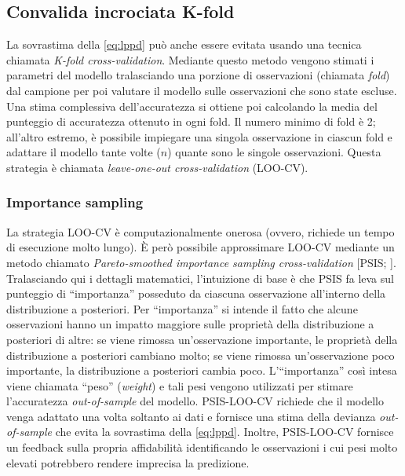 \documentclass[
  10pt,
  italian,
  a4paper,
  extrafontsizes,onecolumn,openright
  ]{memoir}
\theoremstyle{definition}
\theoremstyle{definition}
\theoremstyle{definition}
\theoremstyle{definition}
\theoremstyle{remark}
\begin{document}
\hypertarget{convalida-incrociata-k-fold}{%
\subsection{Convalida incrociata K-fold}\label{convalida-incrociata-k-fold}}

La sovrastima della \eqref{eq:lppd} può anche essere evitata usando una tecnica chiamata \emph{K-fold cross-validation}. Mediante questo metodo vengono stimati i parametri del modello tralasciando una porzione di osservazioni (chiamata \emph{fold}) dal campione per poi valutare il modello sulle osservazioni che sono state escluse. Una stima complessiva dell'accuratezza si ottiene poi calcolando la media del punteggio di accuratezza ottenuto in ogni fold. Il numero minimo di fold è 2; all'altro estremo, è possibile impiegare una singola osservazione in ciascun fold e adattare il modello tante volte (\(n\)) quante sono le singole osservazioni. Questa strategia è chiamata \emph{leave-one-out cross-validation} (LOO-CV).

\hypertarget{importance-sampling}{%
\subsubsection{Importance sampling}\label{importance-sampling}}

La strategia LOO-CV è computazionalmente onerosa (ovvero, richiede un tempo di esecuzione molto lungo). È però possibile approssimare LOO-CV mediante un metodo chiamato \emph{Pareto-smoothed importance sampling cross-validation} {[}PSIS; \textcite{vehtari2017practical}{]}. Tralasciando qui i dettagli matematici, l'intuizione di base è che PSIS fa leva sul punteggio di ``importanza'' posseduto da ciascuna osservazione all'interno della distribuzione a posteriori. Per ``importanza'' si intende il fatto che alcune osservazioni hanno un impatto maggiore sulle proprietà della distribuzione a posteriori di altre: se viene rimossa un'osservazione importante, le proprietà della distribuzione a posteriori cambiano molto; se viene rimossa un'osservazione poco importante, la distribuzione a posteriori cambia poco.
L'``importanza'' così intesa viene chiamata ``peso'' (\emph{weight}) e tali pesi vengono utilizzati per stimare l'accuratezza \emph{out-of-sample} del modello.
PSIS-LOO-CV richiede che il modello venga adattato una volta soltanto ai dati e fornisce una stima della devianza \emph{out-of-sample} che evita la sovrastima della \eqref{eq:lppd}. Inoltre, PSIS-LOO-CV fornisce un feedback sulla propria affidabilità identificando le osservazioni i cui pesi molto elevati potrebbero rendere imprecisa la predizione.
\end{document}
